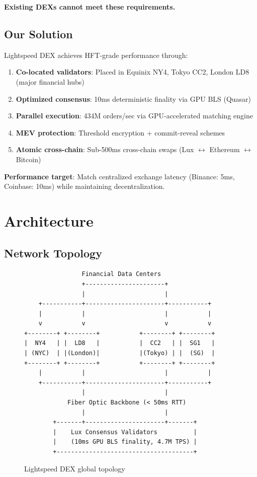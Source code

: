 \documentclass[11pt,letterpaper]{article}
\begin{document}
\textbf{Existing DEXs cannot meet these requirements.}

\subsection{Our Solution}

Lightspeed DEX achieves HFT-grade performance through:

\begin{enumerate}
    \item \textbf{Co-located validators}: Placed in Equinix NY4, Tokyo CC2, London LD8 (major financial hubs)
    \item \textbf{Optimized consensus}: 10ms deterministic finality via GPU BLS (Quasar)
    \item \textbf{Parallel execution}: 434M orders/sec via GPU-accelerated matching engine
    \item \textbf{MEV protection}: Threshold encryption + commit-reveal schemes
    \item \textbf{Atomic cross-chain}: Sub-500ms cross-chain swaps (Lux $\leftrightarrow$ Ethereum $\leftrightarrow$ Bitcoin)
\end{enumerate}

\textbf{Performance target}: Match centralized exchange latency (Binance: 5ms, Coinbase: 10ms) while maintaining decentralization.

\section{Architecture}

\subsection{Network Topology}

\begin{figure}[h]
\centering
\begin{verbatim}
                Financial Data Centers
                +----------------------+
                |                      |
    +-----------+----------------------+-----------+
    |           |                      |           |
    v           v                      v           v
+--------+ +--------+           +--------+ +--------+
|  NY4   | |  LD8   |           |  CC2   | |  SG1   |
| (NYC)  | |(London)|           |(Tokyo) | |  (SG)  |
+--------+ +--------+           +--------+ +--------+
    |           |                      |           |
    +-----------+----------------------+-----------+
                |                      |
            Fiber Optic Backbone (< 50ms RTT)
                |                      |
        +-------+----------------------+-------+
        |    Lux Consensus Validators          |
        |    (10ms GPU BLS finality, 4.7M TPS) |
        +--------------------------------------+
\end{verbatim}
\caption{Lightspeed DEX global topology}
\end{figure}
\end{document}

